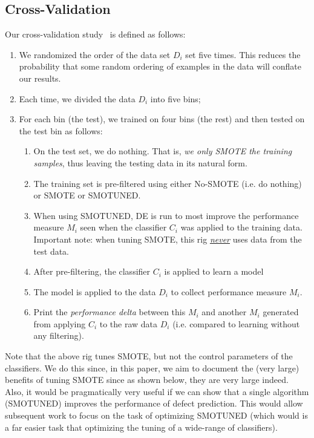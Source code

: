 \documentclass[10pt,conference]{IEEEtran}
\newcommand{\be}{\begin{enumerate}}
\newcommand{\ee}{\end{enumerate}}
\theoremstyle{break}
\theoremstyle{break}
\begin{document}
\subsection{Cross-Validation}
Our  cross-validation study~\cite{refaeilzadeh2009cross} is defined as follows:
\be
\item We randomized the order of the data set $D_i$ set five times. This reduces the probability
that some random ordering of examples in the data will conflate our results.
\item Each time, we divided the data $D_i$ into five bins;
\item For each bin (the test), we trained on four bins (the rest) and then tested
on the test bin as follows:
\be
\item
On the test set, we do nothing. That is, 
 {\em we only SMOTE the training samples}, thus leaving
the  testing data in its natural form.
\item
The  training set is pre-filtered using either No-SMOTE (i.e. do nothing) or  SMOTE or SMOTUNED.  
\item
When using SMOTUNED, DE is  run to most improve
the performance measure $M_i$ seen when the classifier $C_i$ was applied to the training data.
Important note: when tuning SMOTE, this rig \underline{{\em never}} uses data from the test data.
\item
After pre-filtering, the classifier $C_i$ is applied to learn a model
\item
The model is applied to the data $D_i$ to collect performance measure $M_i$. 
\item 
Print the {\em performance delta} between this $M_i$ and another  $M_i$
generated from applying $C_i$ to the raw data $D_i$ (i.e. compared to learning
without any filtering).
\ee
\ee
Note that the above rig tunes SMOTE, but not the control parameters of the classifiers.
We do this since, in this paper,  we aim to document the (very large) benefits of tuning SMOTE since as shown below, they are very large indeed. Also, it would be  pragmatically very useful if we can show that a single algorithm (SMOTUNED)  improves the performance of defect prediction. This would allow
subsequent work to focus on the task of optimizing  SMOTUNED (which would is a far easier
task that optimizing the tuning of a wide-range of classifiers). 
 
\end{document}
